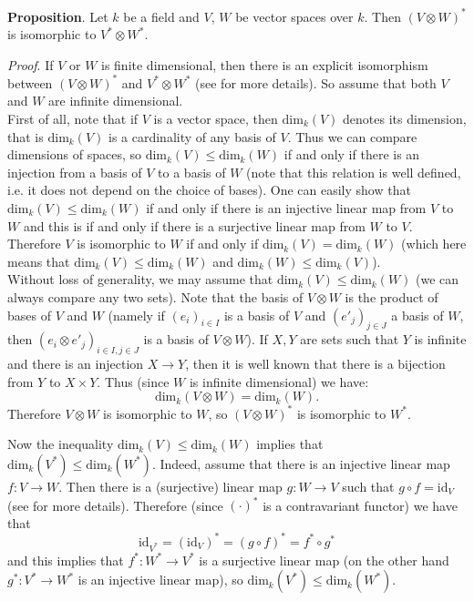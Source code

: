 \documentclass[12pt]{article}
\begin{document}
\textbf{Proposition}. Let $k$ be a field and $V$, $W$ be vector spaces over $k$. Then $(V\otimes W)^{*}$ is isomorphic to $V^{*}\otimes W^{*}$.

\textit{Proof}. If $V$ or $W$ is finite dimensional, then there is an explicit isomorphism between $(V\otimes W)^{*}$ and $V^{*}\otimes W^{*}$ (see  for more details). So assume that both $V$ and $W$ are infinite dimensional. \\

First of all, note that if $V$ is a vector space, then $\mathrm{dim}_{k}(V)$ denotes its dimension, that is $\mathrm{dim}_{k}(V)$ is a cardinality of any basis of $V$. Thus we can compare dimensions of spaces, so $\mathrm{dim}_{k}(V)\leq\mathrm{dim}_{k}(W)$ if and only if there is an injection from a basis of $V$ to a basis of $W$ (note that this relation is well defined, i.e. it does not depend on the choice of bases). One can easily show that $\mathrm{dim}_{k}(V)\leq\mathrm{dim}_{k}(W)$ if and only if there is an injective linear map from $V$ to $W$ and this is if and only if there is a surjective linear map from $W$ to $V$. Therefore $V$ is isomorphic to $W$ if and only if $\mathrm{dim}_{k}(V)=\mathrm{dim}_{k}(W)$ (which here means that $\mathrm{dim}_{k}(V)\leq\mathrm{dim}_{k}(W)$ and $\mathrm{dim}_{k}(W)\leq\mathrm{dim}_{k}(V)$). \\

Without loss of generality, we may assume that $\mathrm{dim}_{k}(V)\leq\mathrm{dim}_{k}(W)$ (we can always compare any two sets). Note that the basis of $V\otimes W$ is the product of bases of $V$ and $W$ (namely if $(e_i)_{i\in I}$ is a basis of $V$ and $(e'_{j})_{j\in J}$ a basis of $W$, then $(e_{i}\otimes e'_{j})_{i\in I,j\in J}$ is a basis of $V\otimes W$). If $X,Y$ are sets such that $Y$ is infinite and there is an injection $X\to Y$, then it is well known that there is a bijection from $Y$ to $X\times Y$. Thus (since $W$ is infinite dimensional) we have: $$\mathrm{dim}_{k}(V\otimes W)=\mathrm{dim}_{k}(W).$$
Therefore $V\otimes W$ is isomorphic to $W$, so $(V\otimes W)^{*}$ is isomorphic to $W^{*}$.

Now the inequality $\mathrm{dim}_{k}(V)\leq\mathrm{dim}_{k}(W)$ implies that $\mathrm{dim}_{k}(V^{*})\leq\mathrm{dim}_{k}(W^{*})$. Indeed, assume that there is an injective linear map $f:V\to W$. Then there is a (surjective) linear map $g:W\to V$ such that $g\circ f =\mathrm{id}_{V}$ (see  for more details). Therefore (since $(\cdot)^{*}$ is a contravariant functor) we have that $$\mathrm{id}_{V^{*}}=(\mathrm{id}_{V})^{*}=(g\circ f)^{*}=f^{*}\circ g^{*}$$
and this implies that $f^{*}:W^{*}\to V^{*}$ is a surjective linear map (on the other hand $g^{*}:V^{*}\to W^{*}$ is an injective linear map), so $\mathrm{dim}_{k}(V^{*})\leq\mathrm{dim}_{k}(W^{*})$.
\end{document}
